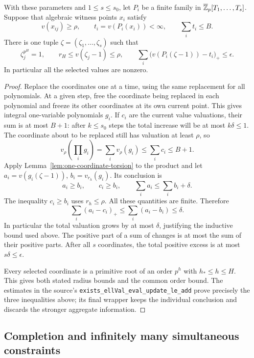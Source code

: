 \begin{proposition}
\label{prop:polynomial-excess}
With these parameters and $1\le s\le s_0$, let $P_i$ be a finite
family in $\overline{\mathbb Z}_p[T_1,\ldots,T_s]$. Suppose that algebraic
witness points $x_i$ satisfy
\[
 v(x_{ij})\ge\rho,\qquad
 t_i=v(P_i(x_i))<\infty,\qquad\sum_i t_i\le B.
\]
There is one tuple $\zeta=(\zeta_1,\ldots,\zeta_s)$ such that
\[
 \zeta_j^{p^H}=1,\qquad r_H\le v(\zeta_j-1)\le\rho,
 \qquad
 \sum_i\bigl(v(P_i(\zeta-1))-t_i\bigr)_+\le\epsilon.
\]
In particular all the selected values are nonzero.
\end{proposition}

\begin{proof}
Replace the coordinates one at a time, using the same replacement for
all polynomials. At a given step, free the coordinate being replaced
in each polynomial and freeze its other coordinates at its own current
point. This gives integral one-variable polynomials $g_i$. If $c_i$
are the current value valuations, their sum is at most $B+1$: after
$k\le s_0$ steps the total increase will be at most $k\delta\le1$.
The coordinate about to be replaced still has valuation at least
$\rho$, so
\[
 v_\rho\left(\prod_i g_i\right)
 =\sum_i v_\rho(g_i)\le\sum_i c_i\le B+1.
\]
Apply Lemma~\ref{lem:one-coordinate-torsion} to the product and let
$a_i=v(g_i(\zeta-1))$, $b_i=v_{r_h}(g_i)$. Its conclusion is
\[
 a_i\ge b_i,\qquad c_i\ge b_i,\qquad
 \sum_i a_i\le\sum_i b_i+\delta.
\]
The inequality $c_i\ge b_i$ uses $r_h\le\rho$. All these quantities
are finite. Therefore
\[
 \sum_i(a_i-c_i)_+
 \le\sum_i(a_i-b_i)\le\delta.
\]
In particular the total valuation grows by at most $\delta$, justifying
the inductive bound used above. The positive part of a sum of changes
is at most the sum of their positive parts. After all $s$ coordinates,
the total positive excess is at most $s\delta\le\epsilon$.

Every selected coordinate is a primitive root of an order $p^h$ with
$h_*\le h\le H$. This gives both stated radius bounds and the common
order bound. The estimates in the source's
\texttt{exists\_ellVal\_eval\_update\_le\_add} prove precisely the
three inequalities above; its final wrapper keeps the individual
conclusion and discards the stronger aggregate information.
\end{proof}

\subsection{Completion and infinitely many simultaneous constraints}

